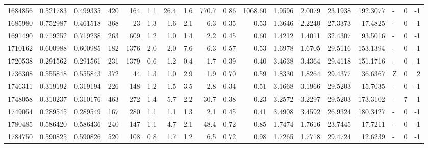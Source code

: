 \begin{tabular}{rrrrrrrrrrrrrrrlrr}
   1684856 & 0.521783 &   0.499335 &  420 &  164 &      1.1 &     26.4 &     1.6 &    770.7 &       0.86 &     1068.60 &  1.9596 &  2.0079 &   23.1938 &  192.3077 &             - &        0 &         -1 \\
   1685980 & 0.752987 &   0.461518 &  368 &   23 &      1.3 &      1.6 &     2.1 &      6.3 &       0.35 &        0.53 &  1.3646 &  2.2240 &   27.3373 &   17.4825 &             - &        0 &         -1 \\
   1691490 & 0.719252 &   0.719238 &  263 &  609 &      1.2 &      1.0 &     1.4 &      2.2 &       0.45 &        0.60 &  1.4212 &  1.4011 &   32.4307 &   93.5016 &             - &        0 &         -1 \\
   1710162 & 0.600988 &   0.600985 &  182 & 1376 &      2.0 &      2.0 &     7.6 &      6.3 &       0.57 &        0.53 &  1.6978 &  1.6705 &   29.5116 &  153.1394 &             - &        0 &         -1 \\
   1720538 & 0.291562 &   0.291561 &  231 & 1379 &      0.6 &      1.2 &     0.4 &      1.7 &       0.39 &        0.40 &  3.4638 &  3.4364 &   29.4118 &  151.1716 &             - &        0 &         -1 \\
   1736308 & 0.555848 &   0.555843 &  372 &   44 &      1.3 &      1.0 &     2.9 &      1.9 &       0.70 &        0.59 &  1.8330 &  1.8264 &   29.4377 &   36.6367 &             Z &        0 &          2 \\
   1746311 & 0.319192 &   0.319194 &  226 &  148 &      1.2 &      1.5 &     3.5 &      2.8 &       0.34 &        0.51 &  3.1668 &  3.1966 &   29.5203 &   15.7035 &             - &        0 &         -1 \\
   1748058 & 0.310237 &   0.310176 &  463 &  272 &      1.4 &      5.7 &     2.2 &     30.7 &       0.38 &        0.23 &  3.2572 &  3.2297 &   29.5203 &  173.3102 &             - &        7 &          1 \\
   1749054 & 0.289545 &   0.289549 &  167 &  280 &      1.1 &      1.1 &     1.3 &      2.1 &       0.45 &        0.41 &  3.4908 &  3.4592 &   26.9324 &  180.3427 &             - &        0 &         -1 \\
   1780485 & 0.586420 &   0.586436 &  240 &  147 &      1.1 &      4.7 &     2.1 &     48.4 &       0.72 &        0.85 &  1.7474 &  1.7616 &   23.7445 &   17.7211 &             - &        0 &         -1 \\
   1784750 & 0.590825 &   0.590826 &  520 &  108 &      0.8 &      1.7 &     1.2 &      6.5 &       0.72 &        0.98 &  1.7265 &  1.7718 &   29.4724 &   12.6239 &             - &        0 &         -1 \\

\end{tabular}
